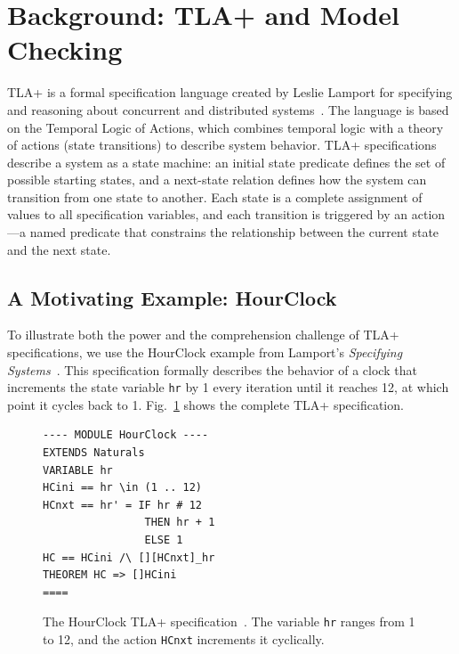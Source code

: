\documentclass[conference]{IEEEtran}
\begin{document}
\section{Background: TLA+ and Model Checking}
\label{sec:background}

TLA+ is a formal specification language created by Leslie Lamport for specifying and reasoning about concurrent and distributed systems~\cite{lamport2003specifying}. The language is based on the Temporal Logic of Actions, which combines temporal logic with a theory of actions (state transitions) to describe system behavior. TLA+ specifications describe a system as a state machine: an initial state predicate defines the set of possible starting states, and a next-state relation defines how the system can transition from one state to another. Each state is a complete assignment of values to all specification variables, and each transition is triggered by an action---a named predicate that constrains the relationship between the current state and the next state.

\subsection{A Motivating Example: HourClock}

To illustrate both the power and the comprehension challenge of TLA+ specifications, we use the HourClock example from Lamport's \textit{Specifying Systems}~\cite{lamport2003specifying}. This specification formally describes the behavior of a clock that increments the state variable \texttt{hr} by 1 every iteration until it reaches 12, at which point it cycles back to 1. Fig.~\ref{fig:hourclock_spec} shows the complete TLA+ specification.

\begin{figure}[t]
\begin{lstlisting}[language={},morekeywords={MODULE,EXTENDS,VARIABLE,THEOREM,IF,THEN,ELSE}]
---- MODULE HourClock ----
EXTENDS Naturals
VARIABLE hr
HCini == hr \in (1 .. 12)
HCnxt == hr' = IF hr # 12
                THEN hr + 1
                ELSE 1
HC == HCini /\ [][HCnxt]_hr
THEOREM HC => []HCini
====
\end{lstlisting}
\caption{The HourClock TLA+ specification~\cite{lamport2003specifying}. The variable \texttt{hr} ranges from 1 to 12, and the action \texttt{HCnxt} increments it cyclically.}
\label{fig:hourclock_spec}
\end{figure}
\end{document}
